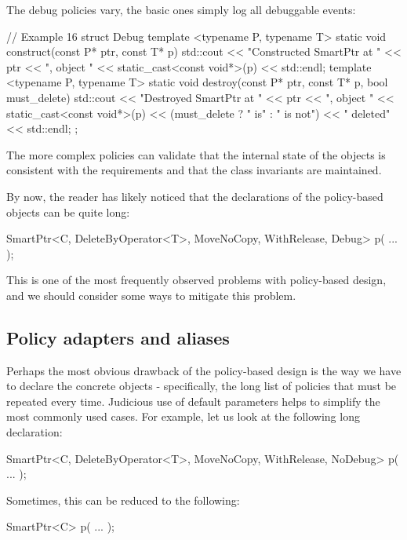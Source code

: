 The debug policies vary, the basic ones simply log all debuggable events:

\begin{code}
// Example 16
struct Debug {
  template <typename P, typename T>
  static void construct(const P* ptr, const T* p) {
    std::cout << "Constructed SmartPtr at " << ptr <<
      ", object " << static_cast<const void*>(p) <<
      std::endl;
  }
  template <typename P, typename T>
  static void destroy(const P* ptr, const T* p,
                      bool must_delete) {
    std::cout << "Destroyed SmartPtr at " << ptr <<
      ", object " << static_cast<const void*>(p) <<
      (must_delete ? " is" : " is not") << " deleted" <<
      std::endl;
  }
};
\end{code}

The more complex policies can validate that the internal state of the objects is consistent with the requirements and that the class invariants are maintained.

By now, the reader has likely noticed that the declarations of the policy-based objects can be quite long:

\begin{code}
SmartPtr<C, DeleteByOperator<T>, MoveNoCopy,
         WithRelease, Debug> p( ... );
\end{code}

This is one of the most frequently observed problems with policy-based design, and we should consider some ways to mitigate this problem.

\subsection{Policy adapters and aliases}

Perhaps the most obvious drawback of the policy-based design is the way we have to declare the concrete objects - specifically, the long list of policies that must be repeated every time. Judicious use of default parameters helps to simplify the most commonly used cases. For example, let us look at the following long declaration:

\begin{code}
SmartPtr<C, DeleteByOperator<T>, MoveNoCopy,
         WithRelease, NoDebug>
p( ... );
\end{code}

Sometimes, this can be reduced to the following:

\begin{code}
SmartPtr<C> p( ... );
\end{code}

